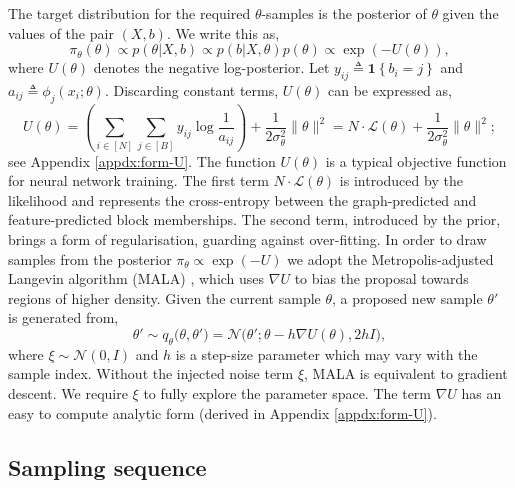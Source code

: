 The target distribution for the required $\theta$-samples 
is the posterior of $\theta$ given the values of the pair $(X, b)$. 
We write this as,
%
\begin{equation}
	\pi_\theta(\theta) \propto p(\theta | X, b) \propto p(b | X, \theta) p(\theta) \propto  \exp \left( - U(\theta) \right),
	\label{eq:U}
\end{equation}
%
where $U(\theta)$ denotes the negative log-posterior. Let $y_{ij} \triangleq \boldsymbol{1} \left\{ b_i = j \right\}$ and $a_{ij} \triangleq \phi_j(x_i; \theta)$. 
Discarding constant terms, $U(\theta)$ can be expressed as,
%
\begin{equation}
	U(\theta) = \left( \sum_{i \in [N]} \sum_{j \in [B]} y_{ij} \log \frac{1}{a_{ij}} \right)
	+ \frac{1}{2\sigma_\theta^2} \|\theta\|^2 = N \cdot \mathcal{L}(\theta) + \frac{1}{2\sigma_\theta^2} \|\theta\|^2;
	\label{eqn:U-form}
\end{equation}
%
see Appendix \ref{appdx:form-U}. The function $U(\theta)$ is a typical objective function for neural network training. The first term $N \cdot \mathcal{L}(\theta)$ is introduced by the likelihood and represents the cross-entropy between the graph-predicted and feature-predicted block memberships. 
The second term, introduced by the prior, brings a form of regularisation, guarding against over-fitting. In order to draw samples from the posterior 
$\pi_\theta \propto \exp(-U)$ we adopt the Metropolis-adjusted Langevin 
algorithm (MALA) \cite{mala-tweedie}, which uses $\nabla U$ to bias the 
proposal towards regions of higher density. Given the current 
sample $\theta$, a proposed 
new sample $\theta'$ is generated from,
%
\begin{equation*}
	\theta' \sim q_\theta\big(\theta, \theta'\big) 
	= \mathcal{N} \big( \theta' ; \theta - h \nabla U(\theta), 2h I \big),
\end{equation*}
%
where $\xi \sim \mathcal{N}(0, I)$ and $h$ is a step-size parameter 
which may vary with the sample index.
Without the injected noise term $\xi$, MALA is equivalent to gradient descent. We require $\xi$ to fully explore the parameter space. 
The term $\nabla U$ has an easy to compute analytic form (derived in Appendix \ref{appdx:form-U}).

\subsection{Sampling sequence}
\label{s:ss}


